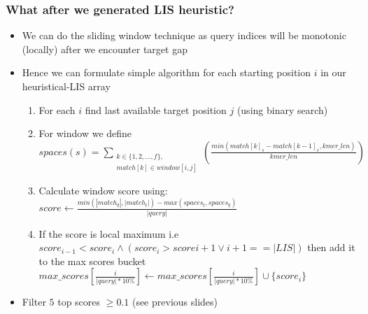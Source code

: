 \documentclass{beamer}
\begin{document}
\begin{frame}
  \frametitle{What after we generated LIS heuristic?}

  \begin{itemize}
    \item We can do the sliding window technique as query indices will be monotonic (locally) after we encounter target gap
    \item Hence we can formulate simple algorithm for each starting position $i$ in our heuristical-LIS array
    \begin{enumerate}
        \item For each $i$ find last available target position $j$ (using binary search)
        \item For window we define $spaces(s) = \sum_{\substack{k \in \{1,2,...,f\},\\match[k] \in window [i, j]}} {(\frac{min(match[k]_s-match[k-1]_s, kmer\_len)}{kmer\_len})}$
        \item Calculate window score using: $score \gets \frac{min(|match_q|, |match_t|) - max(spaces_t, spaces_q)}{|query|}$
        \item If the score is local maximum i.e $score_{i-1} < score_{i} \land (score_{i} > score{i+1} \lor i+1 == |LIS|)$ then add it to the max scores bucket $max\_scores[\frac{i}{|query|*10\%}] \gets max\_scores[\frac{i}{|query|*10\%}] \cup \{score_{i}\}$
    \end{enumerate}
    \item Filter $5$ top scores $\geq 0.1$ (see previous slides)
  \end{itemize}
\end{frame}
\end{document}
